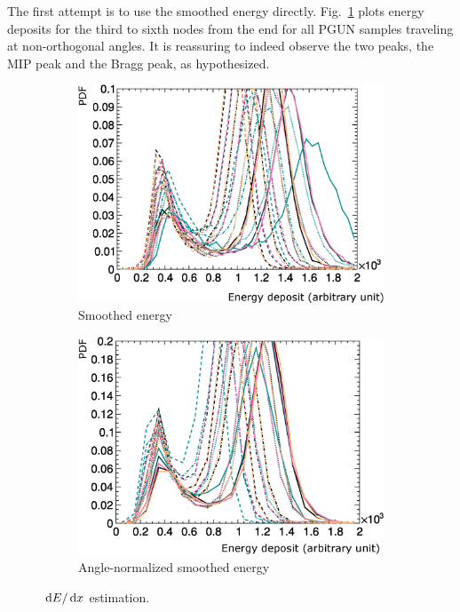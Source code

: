 	The first attempt is to use the smoothed energy directly. 
	Fig.~\ref{subfig:esc-smooth-e} plots energy deposits for the third to sixth nodes from the end for all PGUN samples traveling at non-orthogonal angles.
	It is reassuring to indeed observe the two peaks, the MIP peak and the Bragg peak, as hypothesized. 
  \begin{figure}
        \centering
        \begin{subfigure}[b]{\dbfigwid\textwidth}
             \centering
             \includegraphics[width=\textwidth]{figures/sel/dedx5_pdf_skew_smooth_labelled.eps}
             \caption{Smoothed energy}
             \label{subfig:esc-smooth-e}
        \end{subfigure}
        \begin{subfigure}[b]{\dbfigwid\textwidth}
             \centering
             \includegraphics[width=\textwidth]{figures/sel/an_dedx5_pdf_skew_smooth_angnorm_labelled.eps}
             \caption{Angle-normalized smoothed energy}
             \label{subfig:esc-an-smooth-e}
        \end{subfigure}
        \caption{$\,\textrm{d}E/\,\textrm{d}x$ estimation.}
        \label{fig:esc-angnorm}
  \end{figure}
